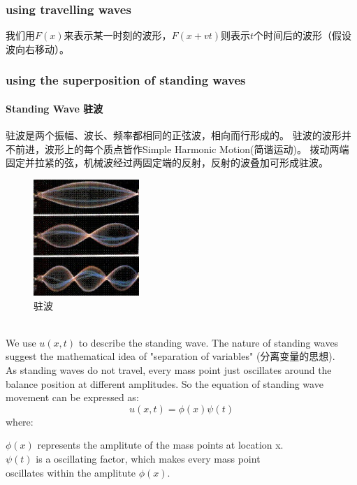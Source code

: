 \documentclass[UTF8,10pt,a4paper]{ctexart}
\begin{document}
		\subsubsection{using travelling waves}
		我们用$F(x)$来表示某一时刻的波形，$F(x+vt)$则表示$t$个时间后的波形（假设波向右移动）。
		\subsubsection{using the superposition of standing waves}
			\paragraph{Standing Wave 驻波}
					驻波是两个振幅、波长、频率都相同的正弦波，相向而行形成的。
					驻波的波形并不前进，波形上的每个质点皆作Simple Harmonic Motion(简谐运动)。
					拨动两端固定并拉紧的弦，机械波经过两固定端的反射，反射的波叠加可形成驻波。\\
					\begin{figure}[ht]
						\centering
						\includegraphics[width=4cm]{standingwave.png}
						\caption{驻波}
						\label{fig:standingWave}
					\end{figure}
					\newpage
					\noindent
					\\		
					We use $u(x,t)$ to describe the standing wave. The nature of standing waves suggest 
					the mathematical idea of "separation of variables" (分离变量的思想).\\
					\noindent
					As standing waves do not travel, every mass point just oscillates around the balance position 
					at different amplitudes. So the equation of standing wave movement can be expressed as:
					\begin{equation}
						u(x,t)=\phi (x) \psi(t)
					\end{equation}
					where:\\
					\begin{center}
					 	$\phi(x)$ represents the amplitute of the mass points at location x. \\
					 	$\psi(t)$ is a oscillating factor, which makes every mass point\\ 
						oscillates within the amplitute $\phi(x)$.		
					\end{center}
\end{document}
